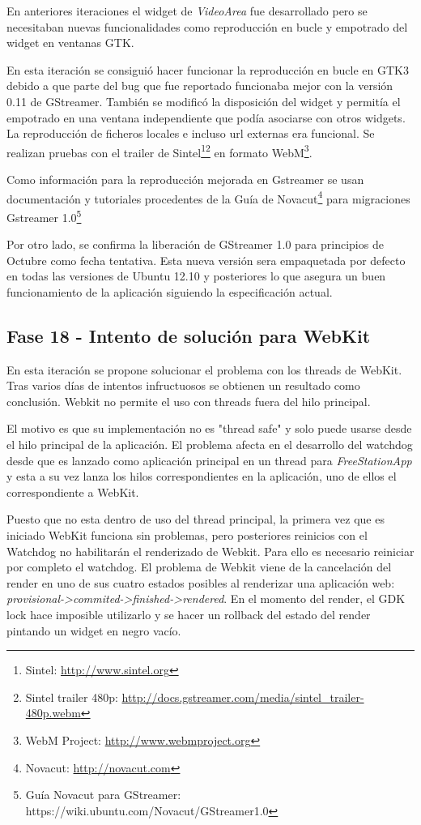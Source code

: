 En anteriores iteraciones el widget de \emph{VideoArea} fue desarrollado pero se
necesitaban nuevas funcionalidades como reproducción en bucle y empotrado del
widget en ventanas GTK.

En esta iteración se consiguió hacer funcionar la reproducción en bucle en GTK3
debido a que parte del bug que fue reportado funcionaba mejor con la versión
0.11 de GStreamer. También se modificó la disposición del widget y permitía el
empotrado en una ventana independiente que podía asociarse con otros widgets. La
reproducción de ficheros locales e incluso url externas era funcional. Se
realizan pruebas con el trailer de Sintel\footnote{Sintel:
\url{http://www.sintel.org}}\footnote{Sintel trailer 480p:
\url{http://docs.gstreamer.com/media/sintel\_trailer-480p.webm}} en formato WebM\footnote{WebM Project:
\url{http://www.webmproject.org}}. 

Como información para la reproducción mejorada en Gstreamer se usan
documentación y tutoriales procedentes de la Guía de Novacut\footnote{Novacut:
\url{http://novacut.com}} para migraciones Gstreamer 1.0\footnote{Guía Novacut
para GStreamer:\\https://wiki.ubuntu.com/Novacut/GStreamer1.0}

Por otro lado, se confirma la liberación de GStreamer 1.0 para principios de
Octubre como fecha tentativa. Esta nueva versión sera empaquetada por defecto en
todas las versiones de Ubuntu 12.10 y posteriores lo que asegura un buen
funcionamiento de la aplicación siguiendo la especificación actual.

\subsection{Fase 18 - Intento de solución para WebKit}

En esta iteración se propone solucionar el problema con los threads de WebKit.
Tras varios días de intentos infructuosos se obtienen un resultado como
conclusión. Webkit no permite el uso con threads fuera del hilo principal.

El motivo es que su implementación no es "thread safe" y solo puede
usarse desde el hilo principal de la aplicación. El problema afecta en el
desarrollo del watchdog desde que es lanzado como aplicación principal en un
thread para \emph{FreeStationApp} y esta a su vez lanza los hilos
correspondientes en la aplicación, uno de ellos el correspondiente a WebKit.

Puesto que no esta dentro de uso del thread principal, la primera vez que es
iniciado WebKit funciona sin problemas, pero posteriores reinicios con el
Watchdog no habilitarán el renderizado de Webkit. Para ello es necesario
reiniciar por completo el watchdog. El problema de Webkit viene de la
cancelación del render en uno de sus cuatro estados posibles al renderizar una
aplicación web: \emph{provisional->commited->finished->rendered}. En el momento
del render, el GDK lock hace imposible utilizarlo y se hacer un rollback del
estado del render pintando un widget en negro vacío. 

